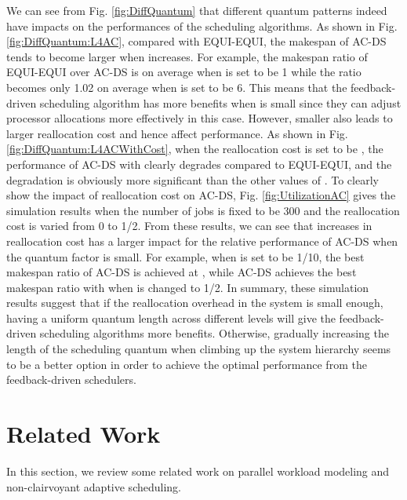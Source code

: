 \documentclass[10pt, a4paper]{article}
\begin{document}
We can see from Fig. \ref{fig:DiffQuantum} that different quantum patterns indeed have impacts on
the performances of the scheduling algorithms. As shown in Fig. \ref{fig:DiffQuantum:L4AC},
compared with EQUI-EQUI, the makespan of AC-DS tends to become larger when  increases. For
example, the makespan ratio of EQUI-EQUI over AC-DS is  on average when  is set to be 1
while the ratio becomes only 1.02 on average when  is set to be 6. This means that the
feedback-driven scheduling algorithm has more benefits when  is small since they can adjust
processor allocations more effectively in this case. However, smaller  also leads to larger
reallocation cost and hence affect performance. As shown in Fig.
\ref{fig:DiffQuantum:L4ACWithCost}, when the reallocation cost  is set to be , the
performance of AC-DS with  clearly degrades compared to EQUI-EQUI, and the degradation is
obviously more significant than the other values of . To clearly show the impact of
reallocation cost on AC-DS, Fig. \ref{fig:UtilizationAC} gives the simulation results when the
number of jobs is fixed to be 300 and the reallocation cost  is varied from 0 to 1/2. From
these results, we can see that increases in reallocation cost has a larger impact for the relative
performance of AC-DS when the quantum factor  is small. For example, when  is set to be
1/10, the best makespan ratio of AC-DS is achieved at , while AC-DS achieves the best
makespan ratio with  when  is changed to 1/2. In summary, these simulation results
suggest that if the reallocation overhead in the system is small enough, having a uniform quantum
length across different levels will give the feedback-driven scheduling algorithms more benefits.
Otherwise, gradually increasing the length of the scheduling quantum when climbing up the system
hierarchy seems to be a better option in order to achieve the optimal performance from the
feedback-driven schedulers.

\section{Related Work}

In this section, we review some related work on parallel workload modeling and non-clairvoyant
adaptive scheduling.
\end{document}
